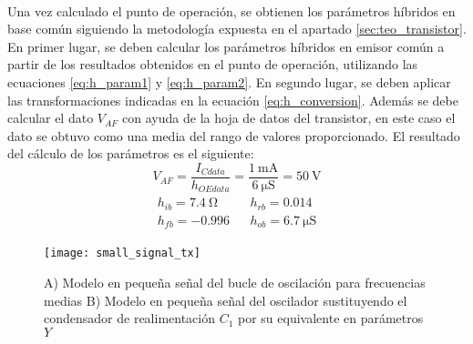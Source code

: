 \paragraph{}
Una vez calculado el punto de operaci\'on, se obtienen los par\'ametros h\'ibridos en base com\'un siguiendo la metodolog\'ia expuesta en el apartado \ref{sec:teo_transistor}. En primer lugar, se deben calcular los parámetros híbridos en emisor común a partir de los resultados obtenidos en el punto de operación, utilizando las ecuaciones \ref{eq:h_param1} y \ref{eq:h_param2}. En segundo lugar, se deben aplicar las transformaciones indicadas en la ecuaci\'on \ref{eq:h_conversion}. Adem\'as se debe calcular el dato $V_{AF}$ con ayuda de la hoja de datos del transistor, en este caso el dato se obtuvo como una media del rango de valores proporcionado. El resultado del c\'alculo de los par\'ametros es el siguiente:
\begin{equation}
   \label{eq:result_pol1}
V_{AF} = \frac{I_{Cdata}}{h_{OEdata}} =\frac{\SI{1}{\milli\ampere}}{\SI{6}{\micro\siemens}} =  \SI{50}{\volt} 
\end{equation}
\begin{equation}
   \label{eq:result_pol2}
\begin{array}{rl} 
      \begin{array}{l}
	 h_{ib} =  \SI{7.4}{\ohm} \\
	 h_{fb} =  -0.996
      \end{array}
      &
      \begin{array}{l}
	 h_{rb} =  0.014 \\
	 h_{ob} =  \SI{6.7}{\micro\siemens}
      \end{array}
\end{array}
\end{equation}

\begin{figure}[h]
    \centering
    \texttt{[image: small\_signal\_tx]}
    \caption{A) Modelo en pequeña señal del bucle de oscilación para frecuencias medias B) Modelo en pequeña señal del oscilador sustituyendo el condensador de realimentación $C_1$ por su equivalente en parámetros $Y$}
    \label{fig:ss_tx}
\end{figure}

